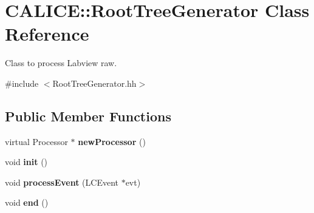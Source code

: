 \section{CALICE::RootTreeGenerator Class Reference}
\label{classCALICE_1_1RootTreeGenerator}


Class to process Labview raw.  


{\ttfamily \#include $<$RootTreeGenerator.hh$>$}\subsection*{Public Member Functions}
\begin{DoxyCompactItemize}
\item 
virtual Processor $\ast$ {\bfseries newProcessor} ()\label{classCALICE_1_1RootTreeGenerator_a190c4a59fb38f29b4d21ecf4c27758c3}

\item 
void {\bfseries init} ()\label{classCALICE_1_1RootTreeGenerator_a4e25c5be1410bed1779b7c48db8861ae}

\item 
void {\bfseries processEvent} (LCEvent $\ast$evt)\label{classCALICE_1_1RootTreeGenerator_a4f7d659ca6c9d90f60a13e698d16d369}

\item 
void {\bfseries end} ()\label{classCALICE_1_1RootTreeGenerator_a4659e1ed27fa7d1ce4863945ab3c32ed}

\end{DoxyCompactItemize}
